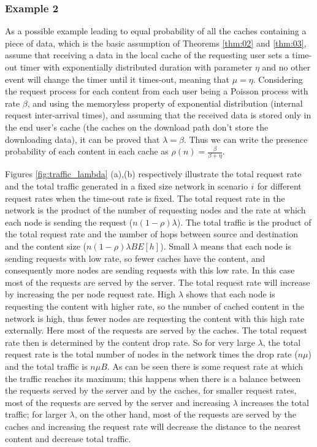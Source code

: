 \documentclass[journal]{IEEEtran}
\theoremstyle{plain}
\theoremstyle{remark}
\begin{document}
\subsubsection{Example 2}
\label{ex:02}

As a possible example leading to equal probability of all the caches containing a piece of data, which is the basic assumption of Theorems \ref{thm:02} and \ref{thm:03}, assume that receiving a data in the local cache of the requesting user sets a time-out timer with exponentially distributed duration with parameter $\eta$ and no other event will change the timer until it times-out, meaning that $\mu=\eta$. Considering the request process for each content from each user being a Poisson process with rate $\beta$, and using the memoryless property of exponential distribution (internal request inter-arrival times), and assuming that the received data is stored only in the end user's cache (the caches on the download path don't store the downloading data), it can be proved that $\lambda=\beta$. Thus we can write the presence probability of each content in each cache as $\rho(n)=\frac{\beta}{\beta+\eta}$. 

Figures \ref{fig:traffic_lambda} (a),(b) respectively illustrate the total request rate and the total traffic generated in a fixed size network in scenario $\romannumeral 1$ for different request rates when the time-out rate is fixed. The total request rate in the network is the product of the number of requesting nodes and the rate at which each node is sending the request ($n(1-\rho)\lambda$). The total traffic is the product of the total request rate and the number of hops between source and destination and the content size ($n(1-\rho)\lambda B E[h]$).
Small $\lambda$ means that each node is sending requests with low rate, so fewer caches have the content, and consequently more nodes are sending requests with this low rate. In this case most of the requests are served by the server. The total request rate will increase by increasing the per node request rate. High $\lambda$ shows that each node is requesting the content with higher rate, so the number of cached content in the network is high, thus fewer nodes are requesting the content with this high rate externally. Here most of the requests are served by the caches. The total request rate then is determined by the content drop rate. So for very large $\lambda$, the total request rate is the total number of nodes in the network times the drop rate ($n\mu$) and the total traffic is $n\mu B$. As can be seen there is some request rate at which the traffic reaches its maximum; this happens when there is a balance between the requests served by the server and by the caches, for smaller request rates, most of the requests are served by the server and increasing $\lambda$ increases the total traffic; for larger $\lambda$, on the other hand, most of the requests are served by the caches and increasing the request rate will decrease the distance to the nearest content and decrease total traffic.
\end{document}
